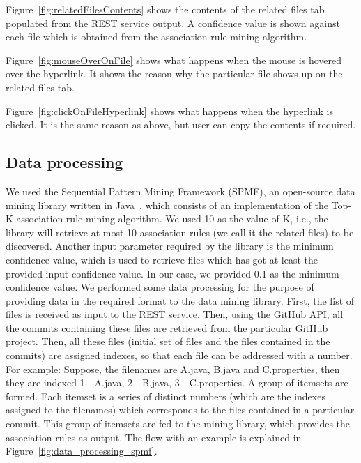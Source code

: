 Figure~\ref{fig:relatedFilesContents} shows the contents of the related files tab populated from the REST service output. A confidence value is shown against each file which is obtained from the association rule mining algorithm.

Figure~\ref{fig:mouseOverOnFile} shows what happens when the mouse is hovered over the hyperlink. It shows the reason why the particular file shows up on the related files tab.

Figure~\ref{fig:clickOnFileHyperlink} shows what happens when the hyperlink is clicked. It is the same reason as above, but user can copy the contents if required.

\subsection{Data processing}
\label{sec:dataprocessing}

We used the Sequential Pattern Mining Framework (SPMF), an open-source data mining library written in Java~\cite{algo_impl}, which consists of an implementation of the Top-K association rule mining algorithm. We used 10 as the value of K, i.e., the library will retrieve at most 10 association rules (we call it the related files) to be discovered. Another input parameter required by the library is the minimum confidence value, which is used to retrieve files which has got at least the provided input confidence value. In our case, we provided 0.1 as the minimum confidence value. We performed some data processing for the purpose of providing data in the required format to the data mining library. First, the list of files is received as input to the REST service. Then, using the GitHub API, all the commits containing these files are retrieved from the particular GitHub project. Then, all these files (initial set of files and the files contained in the commits) are assigned indexes, so that each file can be addressed with a number. For example: Suppose, the filenames are A.java, B.java and C.properties, then they are indexed 1 - A.java, 2 - B.java, 3 - C.properties. A group of itemsets are formed. Each itemset is a series of distinct numbers (which are the indexes assigned to the filenames) which corresponds to the files contained in a particular commit. This group of itemsets are fed to the mining library, which provides the association rules as output. The flow with an example is explained in Figure~\ref{fig:data_processing_spmf}.
